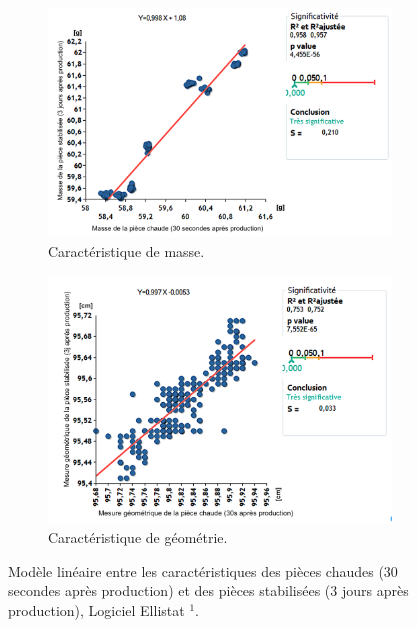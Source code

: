 \begin{figure}[hbtp] \label{fig:corr_results}
	\centering
	\begin{subfigure}[c]{0.48\textwidth}
		\includegraphics[width=\textwidth]{../Chap2/Figures/Capture_2019-09-20_12_19_12.png}
		\caption{Caractéristique de masse.}
	\end{subfigure}
	\begin{subfigure}[c]{0.48\textwidth}
		\includegraphics[width=\textwidth]{../Chap2/Figures/Capture_2019-09-20_12_18_57.png}
		\caption{Caractéristique de géométrie.}
	\end{subfigure}
	\caption{Modèle linéaire entre les caractéristiques des pièces chaudes (30 secondes après production) et des pièces stabilisées (3 jours après production), Logiciel Ellistat $^1$.}
\end{figure}
{}

